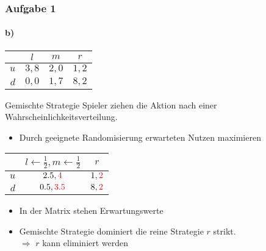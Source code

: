 \documentclass{beamer}
\begin{document}
\begin{frame}
	\frametitle{Aufgabe 1}
	\framesubtitle{b)}

	\centering
	\begin{tabular}{r|c|c|c|}
		& $l$ & $m$ & $r$ \\
		\hline
		$u$ & $3, 8$ & $2, 0$ & $1, 2$ \\
		$d$ & $0, 0$ & $1, 7$ & $8, 2$ \\
		\hline
	\end{tabular}

	\begin{block}{Gemischte Strategie}
		Spieler ziehen die Aktion nach einer Wahrscheinlichkeitsverteilung.
	\end{block}

	\begin{itemize}
		\item Durch geeignete Randomisierung erwarteten Nutzen maximieren
	\end{itemize}

	\begin{tabular}{r|c|c|}
		& $l \leftarrow \frac{1}{2}, m \leftarrow \frac{1}{2} $& $r$ \\
		\hline
		$u$ & $2.5, \textcolor{red}{4}$ & $1, \textcolor{red}{2}$ \\
		$d$ & $0.5, \textcolor{red}{3.5}$ & $8, \textcolor{red}{2}$ \\
		\hline
	\end{tabular}

	\begin{itemize}
		\item In der Matrix stehen Erwartungswerte
		\item Gemischte Strategie dominiert die reine Strategie $r$ strikt.\\
		$\Rightarrow$ $r$ kann eliminiert werden
	\end{itemize}

\end{frame}
\end{document}
